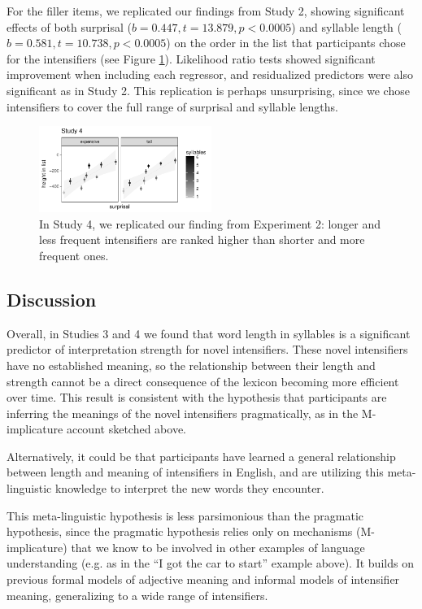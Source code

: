 \documentclass[10pt,letterpaper]{article}
\begin{document}
For the filler items, we replicated our findings from Study 2, showing significant effects of both surprisal ($b=0.447,t=13.879,p<0.0005$)
and syllable length ($b=0.581,t=10.738,p<0.0005$) on the order in the list that participants chose for the intensifiers (see Figure \ref{fig:plot_study4}).
Likelihood ratio tests showed significant improvement when including each regressor, and residualized predictors were also significant as in Study 2.
This replication is perhaps unsurprising, since we chose intensifiers to cover the full range of surprisal and syllable lengths.

\begin{figure}[hbt]
\begin{center}
\includegraphics[width=0.5\textwidth]{images/plot_study4.pdf}
\end{center}
\caption{In Study 4, we replicated our finding from Experiment 2: longer and less frequent intensifiers are ranked higher than shorter and more frequent ones.}
\label{fig:plot_study4}
\end{figure}


\subsection{Discussion}
Overall, in Studies 3 and 4 we found that word length in syllables is a significant predictor of interpretation strength for novel intensifiers.
These novel intensifiers have no established meaning, so the relationship between their length and strength cannot be a direct consequence of the lexicon becoming more efficient over time.
This result is consistent with the hypothesis that participants are inferring the meanings of the novel intensifiers pragmatically, as in the M-implicature account sketched above.

Alternatively, it could be that participants have learned a general relationship between length and meaning of intensifiers in English, and are utilizing this meta-linguistic knowledge to interpret the new words they encounter.

This meta-linguistic hypothesis is less parsimonious than the pragmatic hypothesis, since the pragmatic hypothesis relies only on mechanisms (M-implicature) that we know to be involved in other examples of language understanding (e.g. as in the ``I got the car to start'' example above).
It builds on previous formal models of adjective meaning and informal models of intensifier meaning, generalizing to a wide range of intensifiers.
\end{document}
